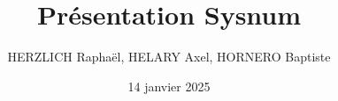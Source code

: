 \documentclass{beamer}
\title{Présentation Sysnum}
\date{14 janvier 2025}
\author{HERZLICH Raphaël, HELARY Axel, HORNERO Baptiste}
\begin{document}
    \frame{\titlepage}
\end{document}
